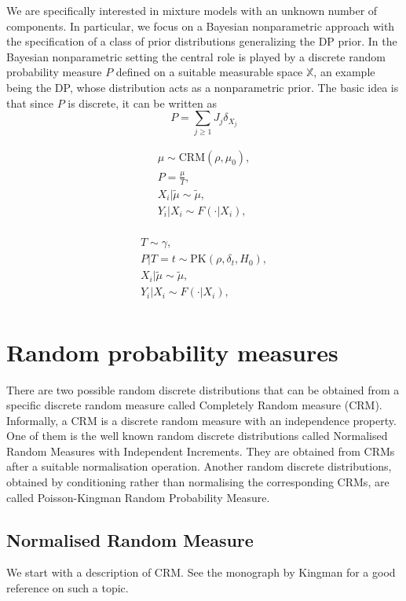 We are specifically interested in mixture models with an unknown number of components. In particular, we focus on a Bayesian nonparametric approach with the specification of a class of prior distributions generalizing the \gls{DP} prior. In the Bayesian nonparametric setting the central role is played by a discrete random probability measure $P$ defined on a suitable measurable space $\mathbb{X}$, an example being the \gls{DP}, whose distribution acts as a nonparametric prior. The basic idea is that since $P$ is discrete, it can be written as
\begin{equation*}
P = \sum_{j \ge 1}{J_j \delta_{X_j}}
\end{equation*}


\begin{gather*}
\mu \sim \text{CRM}(\rho, \mu_0), \\
P = \frac{\mu}{T}, \\
X_i|\tilde{\mu} \sim \tilde{\mu}, \\
Y_i|X_i \sim F(\cdot|X_i), \\
\end{gather*}

\begin{gather*}
T \sim \gamma, \\
P|T=t \sim \text{PK}(\rho, \delta_t, H_0), \\
X_i|\tilde{\mu} \sim \tilde{\mu}, \\
Y_i|X_i \sim F(\cdot|X_i), \\
\end{gather*}

\section{Random probability measures}
There are two possible random discrete distributions that can be obtained from a specific discrete random measure called Completely Random measure (CRM). Informally, a \gls{CRM} is a discrete random measure with an independence property. One of them is the well known random discrete distributions called Normalised Random Measures with Independent Increments. They are obtained from \glspl{CRM} after a suitable normalisation operation. Another random discrete distributions, obtained by conditioning rather than normalising the corresponding \glspl{CRM}, are called Poisson-Kingman Random Probability Measure.

\subsection{Normalised Random Measure}
We start with a description of \gls{CRM}.
See the monograph by Kingman \cite{kingman-poisson-processes} for a good reference on such a topic.

